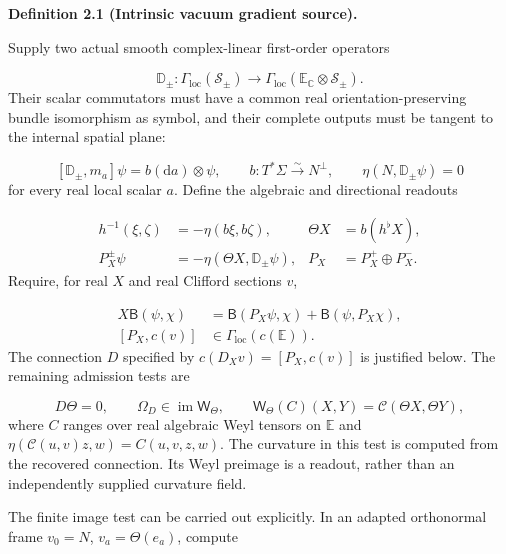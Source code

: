 \documentclass[
  english,
  11pt,
  reqno]{amsart}
\makeatletter
\newcommand{\pandocstatementheading}[1]{%
  \par\addpenalty{\@beginparpenalty}%
  \addvspace{.5\baselineskip plus .2\baselineskip minus .2\baselineskip}%
  {\normalfont\bfseries #1\par}%
  \nobreak\@afterindenttrue\@afterheading
}
\makeatother
\begin{document}
\pandocstatementheading{\leavevmode{}\label{def:online-intrinsic-vacuum-gradient}Definition 2.1 (Intrinsic vacuum gradient source).}

Supply two actual smooth complex-linear first-order operators

\label{eq:online-intrinsic-gradient-operators} \[
\mathbb D_\pm:\Gamma_{\mathrm{loc}}(\mathscr S_\pm)
\longrightarrow
\Gamma_{\mathrm{loc}}(\mathbb E_{\mathbb C}\otimes\mathscr S_\pm).
\] Their scalar commutators must have a common real
orientation-preserving bundle isomorphism as symbol, and their complete
outputs must be tangent to the internal spatial plane:

\label{eq:online-intrinsic-symbol-tests} \[
[\mathbb D_\pm,m_a]\psi=b(\mathrm da)\otimes\psi,
\qquad
b:T^*\Sigma\xrightarrow{\sim}N^\perp,
\qquad
\eta(N,\mathbb D_\pm\psi)=0
\] for every real local scalar \(a\). Define the algebraic and
directional readouts

\label{eq:online-intrinsic-symbol-directional-readout} \[
\begin{aligned}
h^{-1}(\xi,\zeta)&=-\eta(b\xi,b\zeta),&
\Theta X&=b(h^\flat X),\\
P_X^\pm\psi&=-\eta(\Theta X,\mathbb D_\pm\psi),&
P_X&=P_X^+\oplus P_X^-.
\end{aligned}
\] Require, for real \(X\) and real Clifford sections \(v\),

\label{eq:online-intrinsic-normalization-tests} \[
\begin{aligned}
X\mathsf B(\psi,\chi)
&=\mathsf B(P_X\psi,\chi)+\mathsf B(\psi,P_X\chi),\\
[P_X,c(v)]&\in\Gamma_{\mathrm{loc}}(c(\mathbb E)).
\end{aligned}
\] The connection \(D\) specified by \(c(D_Xv)=[P_X,c(v)]\) is justified
below. The remaining admission tests are

\label{eq:online-intrinsic-torsion-weyl-test} \[
D\Theta=0,\qquad
\Omega_D\in\operatorname{im}\mathsf W_\Theta,
\qquad
\mathsf W_\Theta(C)(X,Y)=\mathcal C(\Theta X,\Theta Y),
\] where \(C\) ranges over real algebraic Weyl tensors on \(\mathbb E\)
and \(\eta(\mathcal C(u,v)z,w)=C(u,v,z,w)\). The curvature in this test
is computed from the recovered connection. Its Weyl preimage is a
readout, rather than an independently supplied curvature field.

The finite image test can be carried out explicitly. In an adapted
orthonormal frame \(v_0=N\), \(v_a=\Theta(e_a)\), compute
\end{document}
